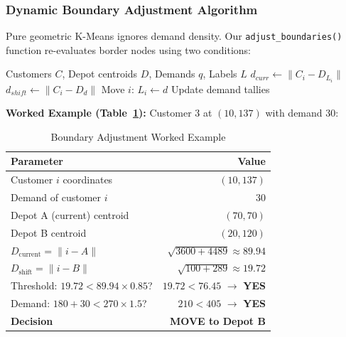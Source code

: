 \documentclass[10pt,conference]{IEEEtran}
\begin{document}
\subsubsection{Dynamic Boundary Adjustment Algorithm}
Pure geometric K-Means ignores demand density. Our \texttt{adjust\_boundaries()} function re-evaluates border nodes using two conditions:

\begin{algorithm}[h]
\caption{Dynamic Boundary Adjustment}
\begin{algorithmic}[1]
\REQUIRE Customers $C$, Depot centroids $D$, Demands $q$, Labels $L$
    \STATE $d_{curr} \leftarrow \|C_i - D_{L_i}\|$
        \STATE $d_{shift} \leftarrow \|C_i - D_d\|$
                \STATE Move $i$: $L_i \leftarrow d$
                \STATE Update demand tallies
            \ENDIF
        \ENDIF
    \ENDFOR
\ENDFOR
\end{algorithmic}
\end{algorithm}

\textbf{Worked Example (Table~\ref{tab:boundary_example}):} Customer 3 at $(10, 137)$ with demand 30:

\begin{table}[h]
\caption{Boundary Adjustment Worked Example}
\label{tab:boundary_example}
\begin{center}
\begin{tabular}{|l|r|}
\hline
\textbf{Parameter} & \textbf{Value} \\
\hline
Customer $i$ coordinates & $(10, 137)$ \\
Demand of customer $i$ & 30 \\
Depot A (current) centroid & $(70, 70)$ \\
Depot B centroid & $(20, 120)$ \\
\hline
$D_{\text{current}} = \|i - A\|$ & $\sqrt{3600+4489} \approx 89.94$ \\
$D_{\text{shift}} = \|i - B\|$ & $\sqrt{100+289} \approx 19.72$ \\
\hline
Threshold: $19.72 < 89.94 \times 0.85$? & $19.72 < 76.45$ $\rightarrow$ \textbf{YES} \\
Demand: $180 + 30 < 270 \times 1.5$? & $210 < 405$ $\rightarrow$ \textbf{YES} \\
\hline
\textbf{Decision} & \textbf{MOVE to Depot B} \\
\hline
\end{tabular}
\end{center}
\end{table}
\end{document}
